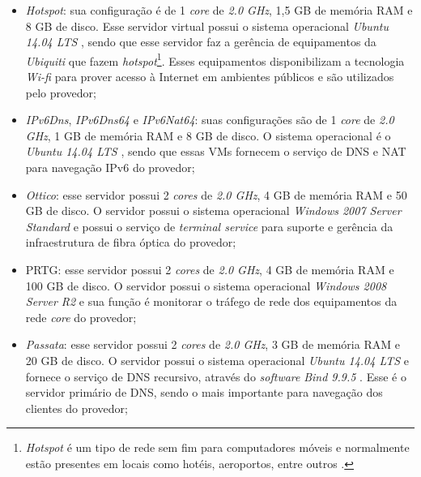 \begin{itemize}
 \item \textit{Hotspot}: sua configuração é de 1 \textit{core} de \textit{2.0 GHz}, 1,5 GB de memória \ac{RAM} e 8 GB de disco. 
 Esse servidor virtual possui o sistema operacional \textit{Ubuntu 14.04 \ac{LTS}} \cite{ubuntu}, sendo que esse servidor faz a gerência de 
 equipamentos da \textit{Ubiquiti} que fazem \textit{hotspot}\footnote[1]{\textit{Hotspot} é um tipo de rede sem fim para computadores móveis 
 e normalmente estão presentes em locais como hotéis, aeroportos, entre outros \cite{tanenbaum2011}.}. Esses equipamentos disponibilizam a 
 tecnologia \textit{Wi-fi} para prover acesso à Internet em ambientes públicos e são utilizados pelo provedor;
 
 \item \textit{IPv6Dns}, \textit{IPv6Dns64} e \textit{IPv6Nat64}: suas configurações são de 1 \textit{core} de \textit{2.0 GHz}, 
 1 GB de memória \ac{RAM} e 8 GB de disco. O sistema operacional é o \textit{Ubuntu 14.04 \ac{LTS}} \cite{ubuntu}, sendo que essas \ac{VM}s
 fornecem o serviço de \ac{DNS} \cite{tanenbaum2011} e \ac{NAT} \cite{kurose2006} para navegação \ac{IPv6} \cite{ipv6} do provedor;
 
 \item \textit{Ottico}: esse servidor possui 2 \textit{cores} de \textit{2.0 GHz}, 4 GB de memória \ac{RAM} e 50 GB de disco. 
 O servidor possui o sistema operacional \textit{Windows 2007 Server Standard} e possui o serviço de \textit{terminal service} para suporte e 
 gerência da infraestrutura de fibra óptica do provedor;
 
 \item \ac{PRTG}: esse servidor possui 2 \textit{cores} de \textit{2.0 GHz}, 4 GB de memória \ac{RAM} e 100 GB de disco. 
 O servidor possui o sistema operacional \textit{Windows 2008 Server R2} e sua função é monitorar o tráfego de rede dos equipamentos da 
 rede \textit{core} do provedor;
 
 \item \textit{Passata}: esse servidor possui 2 \textit{cores} de \textit{2.0 GHz}, 3 GB de memória \ac{RAM} e 20 GB de disco. 
 O servidor possui o sistema operacional \textit{Ubuntu 14.04 \ac{LTS}} \cite{ubuntu} e fornece o serviço de \ac{DNS} recursivo, através do 
 \textit{software} \textit{Bind 9.9.5} \cite{bind}. Esse é o servidor primário de \ac{DNS}, sendo o mais importante para navegação dos clientes 
 do provedor;
 

\end{itemize}
